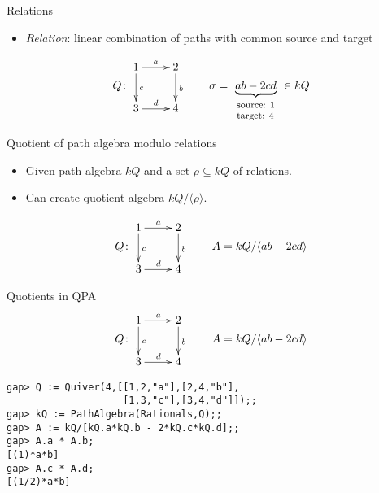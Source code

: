 \documentclass[usenames,dvipsnames]{beamer}
\newcommand{\defn}[1]{\textit{#1}}
\begin{document}
\begin{frame}{Relations}
\begin{itemize}
\item \defn{Relation}: linear combination of paths with common source and target
\end{itemize}
\[
Q \colon
\vcenter{\xymatrix{
1\ar[r]^a\ar[d]^c & 2\ar[d]^b\\
3\ar[r]^d & 4
}}
\qquad
\sigma = \underbrace{ab - 2cd}_{
\footnotesize
\begin{array}{l}
\text{source: $1$}\\
\text{target: $4$}
\end{array}
} \in kQ
\]
\end{frame}

\begin{frame}{Quotient of path algebra modulo relations}
\begin{itemize}
\item Given path algebra $kQ$ and a set $\rho \subseteq kQ$ of relations.
\item Can create quotient algebra $kQ / \langle \rho \rangle$.
\end{itemize}
\[
Q \colon
\vcenter{\xymatrix{
1\ar[r]^a\ar[d]^c & 2\ar[d]^b\\
3\ar[r]^d & 4
}}
\qquad
A = kQ/\langle ab - 2cd \rangle
\]
\end{frame}

\begin{frame}[fragile]{Quotients in QPA}
\[
Q \colon
\vcenter{\xymatrix{
1\ar[r]^a\ar[d]^c & 2\ar[d]^b\\
3\ar[r]^d & 4
}}
\qquad
A = kQ/\langle ab - 2cd \rangle
\]
\begin{verbatim}
gap> Q := Quiver(4,[[1,2,"a"],[2,4,"b"],
                    [1,3,"c"],[3,4,"d"]]);;
gap> kQ := PathAlgebra(Rationals,Q);;
gap> A := kQ/[kQ.a*kQ.b - 2*kQ.c*kQ.d];;
gap> A.a * A.b;
[(1)*a*b]
gap> A.c * A.d;
[(1/2)*a*b]
\end{verbatim}
\end{frame}
\end{document}

